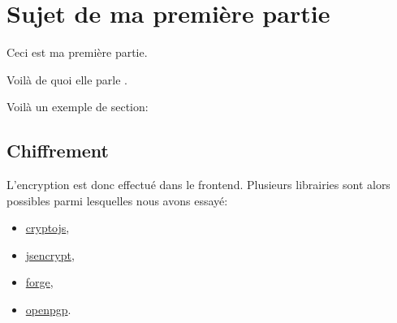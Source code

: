 \section{Sujet de ma première partie} %

Ceci est ma première partie.

Voilà de quoi elle parle \cite{ein05}. %

Voilà un exemple de section:

\subsection{Chiffrement} %

L'encryption est donc effectué dans le frontend. Plusieurs librairies sont
alors possibles parmi lesquelles nous avons essayé:
\begin{itemize}   %
  \item{\href{https://github.com/brix/crypto-js}{cryptojs},} %
  \item{\href{https://github.com/travist/jsencrypt}{jsencrypt},}
  \item{\href{https://github.com/digitalbazaar/forge}{forge},}
  \item{\href{https://github.com/openpgpjs/openpgpjs}{openpgp}.}
\end{itemize}

\medskip %

